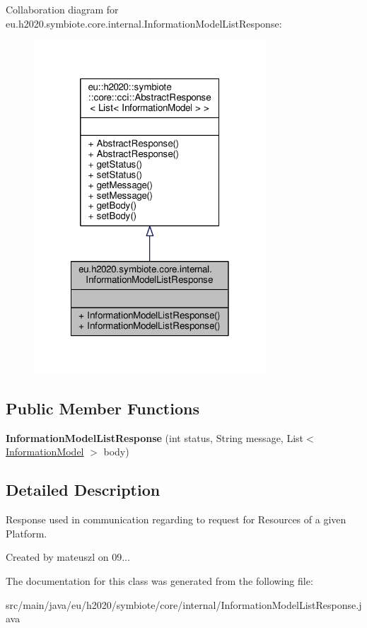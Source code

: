 Collaboration diagram for eu.\+h2020.\+symbiote.\+core.\+internal.\+Information\+Model\+List\+Response\+:\nopagebreak
\begin{figure}[H]
\begin{center}
\leavevmode
\includegraphics[width=246pt]{classeu_1_1h2020_1_1symbiote_1_1core_1_1internal_1_1InformationModelListResponse__coll__graph}
\end{center}
\end{figure}
\subsection*{Public Member Functions}
\begin{DoxyCompactItemize}
\item 
\mbox{\label{classeu_1_1h2020_1_1symbiote_1_1core_1_1internal_1_1InformationModelListResponse_a6c00c1d1623724c3670d81b87eaf862b}} 
{\bfseries Information\+Model\+List\+Response} (int status, String message, List$<$ \hyperlink{classeu_1_1h2020_1_1symbiote_1_1model_1_1mim_1_1InformationModel}{Information\+Model} $>$ body)
\end{DoxyCompactItemize}


\subsection{Detailed Description}
Response used in communication regarding to request for Resources of a given Platform.

Created by mateuszl on 09... 

The documentation for this class was generated from the following file\+:\begin{DoxyCompactItemize}
\item 
src/main/java/eu/h2020/symbiote/core/internal/Information\+Model\+List\+Response.\+java\end{DoxyCompactItemize}
